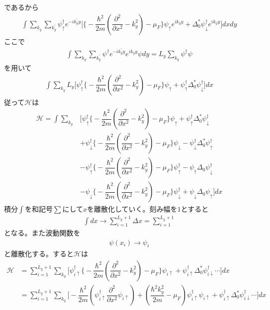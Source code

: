 \documentclass{jarticle}
\begin{document}
	であるから
	\begin{align}
	\int\displaystyle\sum_{k_y}\sum_{k_y^{'}}\psi_{\uparrow}^{\dagger}e^{-ik_y^{'}y}\Big[\big\{-\dfrac{\hbar^2}{2m}(\dfrac{\partial^{2}}{\partial x^2}-k^{2}_y)-\mu_F\big\}\psi_{\uparrow}e^{ik_yy}+\Delta^{*}_0\psi_{\downarrow}^{\dagger}e^{ik_yy}\Big]dxdy
	\end{align}
	ここで
	\begin{align}
	\int\displaystyle\sum_{k_y}\sum_{k_y^{'}}\psi^{\dagger}e^{-ik_y^{'}y}e^{ik_yy}{\psi}dy=L_y\sum_{k_y}\psi^{\dagger}\psi
	\end{align}
	を用いて
	\begin{align}
	\int\displaystyle\sum_{k_y}L_y\Big[\psi_{\uparrow}^{\dagger}\big\{-\dfrac{\hbar^2}{2m}(\dfrac{\partial^{2}}{\partial x^2}-k^{2}_y)-\mu_F\big\}\psi_{\uparrow}+\psi_{\uparrow}^{\dagger}\Delta^{*}_0\psi_{\downarrow}^{\dagger}\Big]dx
	\end{align}
	従って$\mathcal{H}$は
	\begin{align}
	\mathcal{H}=\int\displaystyle\sum_{k_y}&\Big[\psi_{\uparrow}^{\dagger}\big\{-\dfrac{\hbar^2}{2m}(\dfrac{\partial^{2}}{\partial x^2}-k^{2}_y)-\mu_F\big\}\psi_{\uparrow}+\psi_{\uparrow}^{\dagger}\Delta^{*}_0\psi_{\downarrow}^{\dagger}\\
	&+\psi_{\downarrow}^{\dagger}\big\{-\dfrac{\hbar^2}{2m}(\dfrac{\partial^{2}}{\partial x^2}-k^{2}_y)-\mu_F\big\}\psi_{\downarrow}-\psi_{\downarrow}^{\dagger}\Delta^{*}_0\psi_{\uparrow}^{\dagger}\\
	&-\psi_{\uparrow}^{\dagger}\big\{-\dfrac{\hbar^2}{2m}(\dfrac{\partial^{2}}{\partial x^2}-k^{2}_y)-\mu_F\big\}\psi_{\uparrow}^{\dagger}-\psi_{\uparrow}\Delta_0\psi_{\downarrow}^{\dagger}\\
	&-\psi_{\downarrow}\big\{-\dfrac{\hbar^2}{2m}(\dfrac{\partial^{2}}{\partial x^2}-k^{2}_y)-\mu_F\big\}\psi_{\downarrow}^{\dagger}+\psi_{\downarrow}\Delta_0\psi_{\uparrow}\Big]dx
	\end{align}
	積分$\int$を和記号$\sum$にして$x$を離散化していく。刻み幅を$1$とすると
	\begin{align}
	\int dx\rightarrow\sum_{i=1}^{L_y+1}\Delta x=\sum_{i=1}^{L_y+1}
	\end{align}
	となる。また波動関数を
	\begin{align}
	\psi(x_i)\rightarrow\psi_i		
	\end{align}
	と離散化する。すると$\mathcal{H}$は
	\begin{align}
	\mathcal{H}&=\sum_{i=1}^{L_y+1}\displaystyle\sum_{k_y}\Big[\psi_{i\uparrow}^{\dagger}\big\{-\dfrac{\hbar^2}{2m}(\dfrac{\partial^{2}}{\partial x^2}-k^{2}_y)-\mu_F\big\}\psi_{i\uparrow}+\psi_{i\uparrow}^{\dagger}\Delta^{*}_0\psi_{i\downarrow}^{\dagger}\cdots\Big]dx\\
	&=\sum_{i=1}^{L_y+1}\displaystyle\sum_{k_y}\Big[-\dfrac{\hbar^2}{2m}(\psi_{i\uparrow}^{\dagger}\dfrac{\partial^{2}}{\partial x^2}\psi_{i\uparrow})+(\dfrac{\hbar^2k^{2}_y}{2m}-\mu_F)\psi_{i\uparrow}^{\dagger}\psi_{i\uparrow}+\psi_{i\uparrow}^{\dagger}\Delta^{*}_0\psi_{i\downarrow}^{\dagger}\cdots\Big]dx
	\end{align}
\end{document}
